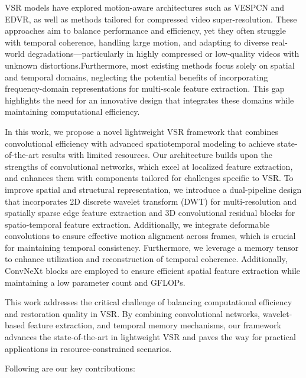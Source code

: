 VSR models have explored motion-aware architectures such as VESPCN\cite{vespcn} and EDVR\cite{wang2019edvr}, as well as methods tailored for compressed video super-resolution\cite{Guan2019MFQE2A}. These approaches aim to balance performance and efficiency, yet they often struggle with temporal coherence, handling large motion, and adapting to diverse real-world degradations—particularly in highly compressed or low-quality videos with unknown distortions.Furthermore, most existing methods focus solely on spatial and temporal domains, neglecting the potential benefits of incorporating frequency-domain representations for multi-scale feature extraction. This gap highlights the need for an innovative design that integrates these domains while maintaining computational efficiency.

In this work, we propose a novel lightweight VSR framework that combines convolutional efficiency with advanced spatiotemporal modeling to achieve state-of-the-art results with limited resources. Our architecture builds upon the strengths of convolutional networks, which excel at localized feature extraction, and enhances them with components tailored for challenges specific to VSR. To improve spatial and structural representation, we introduce a dual-pipeline design that incorporates 2D discrete wavelet transform (DWT) for multi-resolution and spatially sparse edge feature extraction and 3D convolutional residual blocks for spatio-temporal feature extraction. Additionally, we integrate deformable convolutions to ensure effective motion alignment across frames, which is crucial for maintaining temporal consistency. Furthermore, we leverage a memory tensor to enhance utilization and reconstruction of temporal coherence. Additionally, ConvNeXt blocks are employed to ensure efficient spatial feature extraction while maintaining a low parameter count and GFLOPs. 

This work addresses the critical challenge of balancing computational efficiency and restoration quality in VSR. By combining convolutional networks, wavelet-based feature extraction, and temporal memory mechanisms, our framework advances the state-of-the-art in lightweight VSR and paves the way for practical applications in resource-constrained scenarios.


Following are our key contributions:

